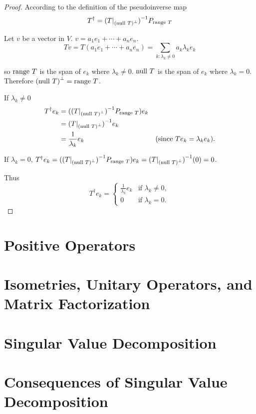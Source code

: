 \begin{proof}
    According to the definition of the pseudoinverse map
    \[
        T^{\dagger} = {(T\vert_{{(\operatorname{null}\,{T})}^{\bot}})}^{-1}P_{\operatorname{range}\,{T}}
    \]

    Let $v$ be a vector in $V$. $v = a_{1}e_{1} + \cdots + a_{n}e_{n}$.
    \[
        Tv = T(a_{1}e_{1} + \cdots + a_{n}e_{n}) = \sum_{k: \lambda_{k}\ne 0} a_{k}\lambda_{k}e_{k}
    \]

    so $\operatorname{range}\,{T}$ is the span of $e_{k}$ where $\lambda_{k}\ne 0$. $\operatorname{null}\,{T}$ is the span of $e_{k}$ where $\lambda_{k} = 0$. Therefore ${(\operatorname{null}\,{T})}^{\bot} = \operatorname{range}\,{T}$.

    If $\lambda_{k}\ne 0$
    \begin{align*}
        T^{\dagger}e_{k} & = ({(T\vert_{{(\operatorname{null}\,{T})}^{\bot}})}^{-1}P_{\operatorname{range}\,{T}})e_{k}                                               \\
                         & = {(T\vert_{{(\operatorname{null}\,{T})}^{\bot}})}^{-1}e_{k}                                                              \\
                         & = \frac{1}{\lambda_{k}}e_{k}                                 & \text{(since $Te_{k} = \lambda_{k}e_{k}$)}.
    \end{align*}

    If $\lambda_{k} = 0$, $T^{\dagger}e_{k} = ({(T\vert_{{(\operatorname{null}\,{T})}^{\bot}})}^{-1}P_{\operatorname{range}\,{T}})e_{k} = {(T\vert_{{(\operatorname{null}\,{T})}^{\bot}})}^{-1}(0) = 0$.

    Thus
    \[
        T^{\dagger}e_{k} = \begin{cases}
            \frac{1}{\lambda_{k}}e_{k} & \text{if $\lambda_{k}\ne 0$}, \\
            0                          & \text{if $\lambda_{k} = 0$}.
        \end{cases}
    \]
\end{proof}
\newpage

\section{Positive Operators}

\section{Isometries, Unitary Operators, and Matrix Factorization}

\section{Singular Value Decomposition}

\section{Consequences of Singular Value Decomposition}

